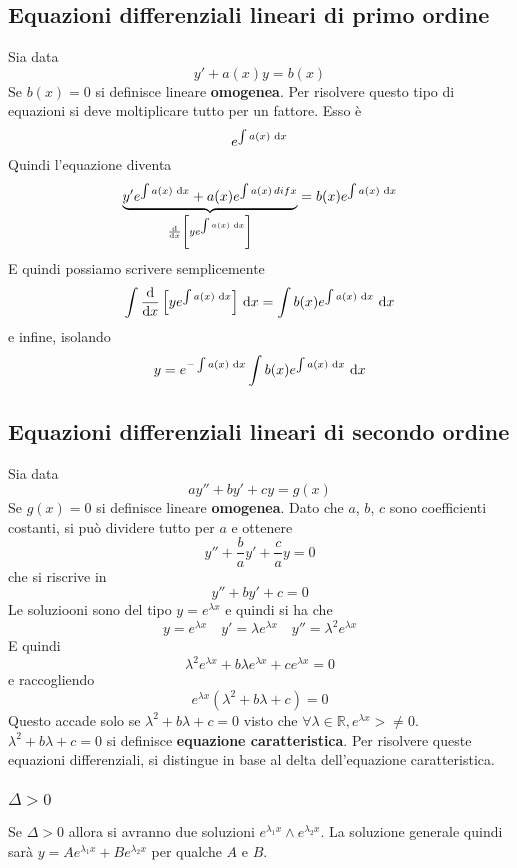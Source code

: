 \subsection{Equazioni differenziali lineari di primo ordine}
Sia data
\begin{equation*}
  y'+a(x)y=b(x)
\end{equation*}
Se $b(x)=0$ si definisce lineare \textbf{omogenea}. Per risolvere questo tipo di equazioni si deve
moltiplicare tutto per un fattore. Esso è
\begin{equation*}
  e^{\int a(x)\,\mathop{}\!\mathrm{d} x}
\end{equation*}
Quindi l'equazione diventa
\begin{equation*}
  \underbrace{y'e^{\int a(x)\,\mathop{}\!\mathrm{d} x}+a(x)e^{\int a(x)\,dif x}}_
  {\frac{\mathop{}\!\mathrm{d}}{\mathop{}\!\mathrm{d} x}\left[ ye^{\int a(x)\,\mathop{}\!\mathrm{d} x} \right]}=b(x)e^{\int a(x)\,\mathop{}\!\mathrm{d} x}
\end{equation*}
E quindi possiamo scrivere semplicemente
\begin{equation*}
  \int \frac{\mathop{}\!\mathrm{d}}{\mathop{}\!\mathrm{d} x}\left[ ye^{\int a(x)\,\mathop{}\!\mathrm{d} x} \right]\,\mathop{}\!\mathrm{d} x = 
  \int b(x)e^{\int a(x)\,\mathop{}\!\mathrm{d} x}\,\mathop{}\!\mathrm{d} x
\end{equation*}
e infine, isolando
\begin{equation*}
  y = e^{-\int a(x)\,\mathop{}\!\mathrm{d} x}\int b(x)e^{\int a(x)\,\mathop{}\!\mathrm{d} x}\,\mathop{}\!\mathrm{d} x
\end{equation*}

\subsection{Equazioni differenziali lineari di secondo ordine}
Sia data
\begin{equation*}
  ay''+by'+cy=g(x) 
\end{equation*}
Se $g(x)=0$ si definisce lineare \textbf{omogenea}. Dato che $a$, $b$, $c$ sono coefficienti 
costanti, si può dividere tutto per $a$ e ottenere
\begin{equation*}
  y''+\frac{b}{a}y'+\frac{c}{a}y=0
\end{equation*}
che si riscrive in
\begin{equation*}
  y''+by'+c=0
\end{equation*}
Le soluziooni sono del tipo $y=e^{\lambda x}$ e quindi si ha che
\begin{equation*}
  y = e^{\lambda x}\quad y'=\lambda e^{\lambda x}\quad y''=\lambda^2 e^{\lambda x}
\end{equation*}
E quindi
\begin{equation*}
  \lambda^2 e^{\lambda x}+b\lambda e^{\lambda x}+ce^{\lambda x}=0
\end{equation*}
e raccogliendo
\begin{equation*}
  e^{\lambda x}(\lambda^2+b\lambda+c)=0
\end{equation*}
Questo accade solo se $\lambda^2+b\lambda+c=0$ visto che 
$\forall \lambda\in\mathbb{R}, e^{\lambda x}>\neq 0$. $\lambda^2+b\lambda+c=0$ si definisce
\textbf{equazione caratteristica}. Per risolvere queste equazioni differenziali, si distingue in base
al delta dell'equazione caratteristica.
\subsubsection{$\Delta > 0$}
Se $\Delta>0$ allora si avranno due soluzioni $e^{\lambda_1 x}\land e^{\lambda_2 x}$. La soluzione
generale quindi sarà $y=Ae^{\lambda_1 x}+Be^{\lambda_2 x}$ per  qualche $A$ e $B$.
